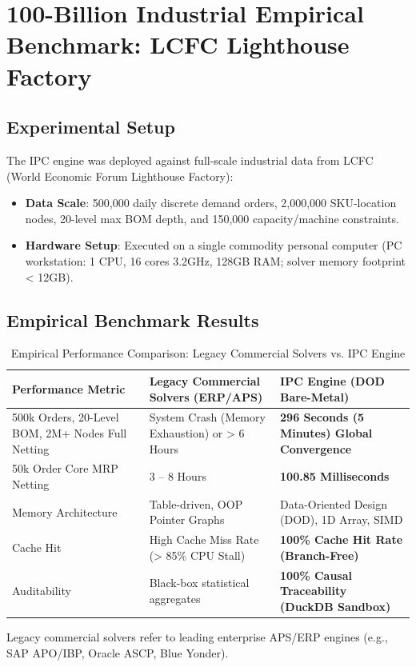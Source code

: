 \documentclass[11pt,a4paper]{article}
\begin{document}
\section{100-Billion Industrial Empirical Benchmark: LCFC Lighthouse Factory}

\subsection{Experimental Setup}
The IPC engine was deployed against full-scale industrial data from LCFC (World Economic Forum Lighthouse Factory):
\begin{itemize}
    \item \textbf{Data Scale}: 500,000 daily discrete demand orders, 2,000,000 SKU-location nodes, 20-level max BOM depth, and 150,000 capacity/machine constraints.
    \item \textbf{Hardware Setup}: Executed on a single commodity personal computer (PC workstation: 1 CPU, 16 cores 3.2GHz, 128GB RAM; solver memory footprint < 12GB).
\end{itemize}

\subsection{Empirical Benchmark Results}

\begin{table}[htbp]
\centering
\begin{threeparttable}
\caption{Empirical Performance Comparison: Legacy Commercial Solvers vs. IPC Engine}
\label{tab:lcfc_benchmark}
\begin{tabular}{p{5.5cm}p{4.5cm}p{4.5cm}}
\toprule
\textbf{Performance Metric} & \textbf{Legacy Commercial Solvers (ERP/APS)}\tnote{1} & \textbf{IPC Engine (DOD Bare-Metal)} \\
\midrule
500k Orders, 20-Level BOM, 2M+ Nodes Full Netting & System Crash (Memory Exhaustion) or > 6 Hours & \textbf{296 Seconds (5 Minutes) Global Convergence} \\
\midrule
50k Order Core MRP Netting & 3 -- 8 Hours & \textbf{100.85 Milliseconds} \\
\midrule
Memory Architecture & Table-driven, OOP Pointer Graphs & Data-Oriented Design (DOD), 1D Array, SIMD \\
\midrule
Cache Hit & High Cache Miss Rate (> 85\% CPU Stall) & \textbf{100\% Cache Hit Rate (Branch-Free)} \\
\midrule
Auditability & Black-box statistical aggregates & \textbf{100\% Causal Traceability (DuckDB Sandbox)} \\
\bottomrule
\end{tabular}
\begin{tablenotes}
\footnotesize
\item[1] Legacy commercial solvers refer to leading enterprise APS/ERP engines (e.g., SAP APO/IBP, Oracle ASCP, Blue Yonder).
\end{tablenotes}
\end{threeparttable}
\end{table}
\end{document}
